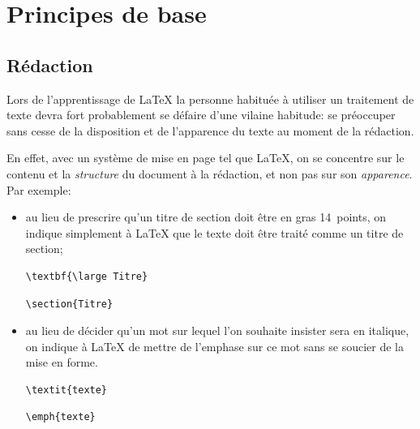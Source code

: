 \chapter{Principes de base}
\label{chap:bases}



\section{Rédaction}
\label{chap:bases:redaction}

Lors de l'apprentissage de {\LaTeX} la personne habituée à utiliser un
traitement de texte  devra fort probablement se défaire d'une vilaine
habitude: se préoccuper sans cesse de la disposition et de l'apparence
du texte au moment de la rédaction.

En effet, avec un système de mise en page tel que {\LaTeX}, on se
concentre sur le contenu et la \emph{structure} du document à la
rédaction, et non pas sur son \emph{apparence}. Par exemple:
\begin{itemize}
\item au lieu de prescrire qu'un titre de section doit être en gras
  14~points, on indique simplement à {\LaTeX} que le texte doit être
  traité comme un titre de section;
  \begin{demo}
    \begin{minipage}{0.45\linewidth}
\begin{lstlisting}
\textbf{\large Titre}
\end{lstlisting}
    \end{minipage}
    \hfill \faArrowRight \hfill
    \begin{minipage}{0.45\linewidth}
\begin{lstlisting}
\section{Titre}
\end{lstlisting}
    \end{minipage}
  \end{demo}
\item au lieu de décider qu'un mot sur lequel l'on souhaite insister
  sera en italique, on indique à {\LaTeX} de mettre de l'emphase sur
  ce mot sans se soucier de la mise en forme.
  \begin{demo}
    \begin{minipage}{0.45\linewidth}
\begin{lstlisting}
\textit{texte}
\end{lstlisting}
    \end{minipage}
    \hfill \faArrowRight \hfill
    \begin{minipage}{0.45\linewidth}
\begin{lstlisting}
\emph{texte}
\end{lstlisting}
    \end{minipage}
  \end{demo}
\end{itemize}

